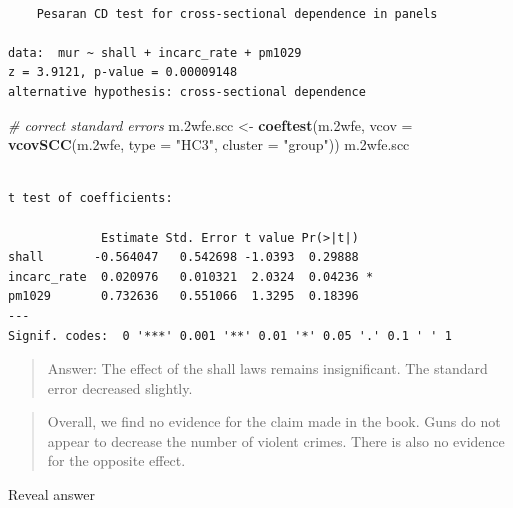 \documentclass[]{article}
\newenvironment{Shaded}{\begin{snugshade}}{\end{snugshade}}
\newcommand{\KeywordTok}[1]{\textcolor[rgb]{0.13,0.29,0.53}{\textbf{#1}}}
\newcommand{\DataTypeTok}[1]{\textcolor[rgb]{0.13,0.29,0.53}{#1}}
\newcommand{\StringTok}[1]{\textcolor[rgb]{0.31,0.60,0.02}{#1}}
\newcommand{\CommentTok}[1]{\textcolor[rgb]{0.56,0.35,0.01}{\textit{#1}}}
\newcommand{\NormalTok}[1]{#1}
\theoremstyle{definition}
\theoremstyle{definition}
\theoremstyle{definition}
\theoremstyle{remark}
\begin{document}
\begin{verbatim}

    Pesaran CD test for cross-sectional dependence in panels

data:  mur ~ shall + incarc_rate + pm1029
z = 3.9121, p-value = 0.00009148
alternative hypothesis: cross-sectional dependence
\end{verbatim}

\begin{Shaded}
\begin{Highlighting}[]
\CommentTok{# correct standard errors}
\NormalTok{m.2wfe.scc <-}\StringTok{ }\KeywordTok{coeftest}\NormalTok{(m.2wfe, }\DataTypeTok{vcov =} \KeywordTok{vcovSCC}\NormalTok{(m.2wfe, }\DataTypeTok{type =} \StringTok{"HC3"}\NormalTok{, }\DataTypeTok{cluster =} \StringTok{"group"}\NormalTok{))}
\NormalTok{m.2wfe.scc}
\end{Highlighting}
\end{Shaded}

\begin{verbatim}

t test of coefficients:

             Estimate Std. Error t value Pr(>|t|)  
shall       -0.564047   0.542698 -1.0393  0.29888  
incarc_rate  0.020976   0.010321  2.0324  0.04236 *
pm1029       0.732636   0.551066  1.3295  0.18396  
---
Signif. codes:  0 '***' 0.001 '**' 0.01 '*' 0.05 '.' 0.1 ' ' 1
\end{verbatim}

\begin{quote}
Answer: The effect of the shall laws remains insignificant. The standard
error decreased slightly.
\end{quote}

\begin{quote}
Overall, we find no evidence for the claim made in the book. Guns do not
appear to decrease the number of violent crimes. There is also no
evidence for the opposite effect.
\end{quote}

 Reveal answer
\end{document}
